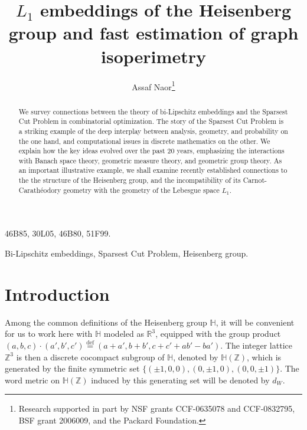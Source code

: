 \documentclass{icm2010}
\title[Embeddings of the Heisenberg group]{$L_1$ embeddings of the Heisenberg group and fast estimation of graph isoperimetry}
\author[Assaf Naor]{Assaf Naor\thanks{Research supported in part by NSF grants CCF-0635078 and CCF-0832795, BSF grant 2006009, and the Packard Foundation.}
}
\theoremstyle{definition}
\newcommand{\R}{\mathbb{R}}
\newcommand{\eqdef}{\stackrel{\mathrm{def}}{=}}
\newcommand{\1}{\mathbf{1}}
\renewcommand{\H}{\mathbb{H}}
\newcommand{\Z}{\mathbb{Z}}
\begin{document}
\begin{abstract} We survey connections between the theory of
bi-Lipschitz embeddings and the Sparsest Cut Problem in
combinatorial optimization. The story of the Sparsest Cut Problem is
a striking example of the deep interplay between analysis, geometry,
and probability on the one hand, and computational issues in
discrete mathematics on the other.
 We
explain how the key ideas evolved over the past 20 years,
emphasizing the interactions with Banach space theory, geometric
measure theory, and geometric group theory.
As an important illustrative example, we shall examine recently
established connections to the the structure
of the Heisenberg group, and the incompatibility of its
Carnot-Carath\'eodory geometry with the geometry of the Lebesgue space $L_1$.
\end{abstract}

\begin{classification}
46B85, 30L05, 46B80, 51F99.
\end{classification}

\begin{keywords}
Bi-Lipschitz embeddings, Sparsest Cut Problem, Heisenberg group.
\end{keywords}

\maketitle



\section{Introduction}


Among the common definitions of the Heisenberg group $\H$, it will
be convenient for us to work here with $\H$ modeled as $\R^3$,
equipped with the group product $(a,b,c)\cdot (a',b',c')\eqdef
(a+a',b+b',c+c'+ab'-ba')$. The integer lattice $\Z^3$ is then a
discrete cocompact subgroup of $\H$, denoted by $\H(\Z)$, which is
generated by the finite symmetric set $\{(\pm1,0,0),(0,\pm1,0),(0,0,\pm1)\}$.
The word metric on $\H(\Z)$ induced by this generating set will be
denoted by $d_W$.
\end{document}
